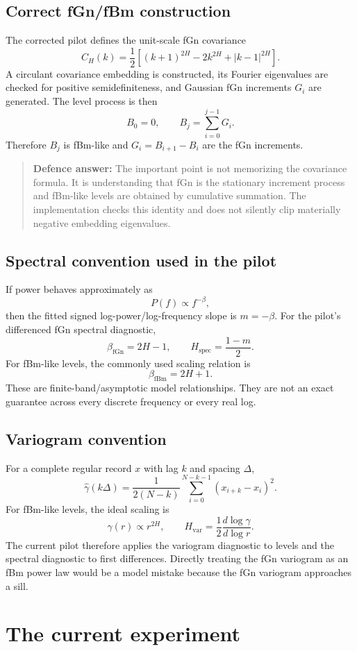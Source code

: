 \documentclass[11pt,a4paper]{article}
\newcommand{\answer}[1]{\begin{quote}\color{Navy}\textbf{Defence answer:} #1\end{quote}}
\begin{document}
\subsection{Correct fGn/fBm construction}
The corrected pilot defines the unit-scale fGn covariance
\[
C_H(k)=\frac{1}{2}\left[(k+1)^{2H}-2k^{2H}+|k-1|^{2H}\right].
\]
A circulant covariance embedding is constructed, its Fourier eigenvalues are checked for positive semidefiniteness, and Gaussian fGn increments $G_i$ are generated. The level process is then
\[
B_0=0,\qquad B_j=\sum_{i=0}^{j-1}G_i.
\]
Therefore $B_j$ is fBm-like and $G_i=B_{i+1}-B_i$ are the fGn increments.

\answer{The important point is not memorizing the covariance formula. It is understanding that fGn is the stationary increment process and fBm-like levels are obtained by cumulative summation. The implementation checks this identity and does not silently clip materially negative embedding eigenvalues.}

\subsection{Spectral convention used in the pilot}
If power behaves approximately as
\[
P(f)\propto f^{-\beta},
\]
then the fitted signed log-power/log-frequency slope is $m=-\beta$. For the pilot's differenced fGn spectral diagnostic,
\[
\beta_{\mathrm{fGn}}=2H-1,\qquad H_{\mathrm{spec}}=\frac{1-m}{2}.
\]
For fBm-like levels, the commonly used scaling relation is
\[
\beta_{\mathrm{fBm}}=2H+1.
\]
These are finite-band/asymptotic model relationships. They are not an exact guarantee across every discrete frequency or every real log.

\subsection{Variogram convention}
For a complete regular record $x$ with lag $k$ and spacing $\Delta$,
\[
\widehat{\gamma}(k\Delta)=\frac{1}{2(N-k)}\sum_{i=0}^{N-k-1}(x_{i+k}-x_i)^2.
\]
For fBm-like levels, the ideal scaling is
\[
\gamma(r)\propto r^{2H},\qquad H_{\mathrm{var}}=\frac{1}{2}\frac{d\log\gamma}{d\log r}.
\]
The current pilot therefore applies the variogram diagnostic to levels and the spectral diagnostic to first differences. Directly treating the fGn variogram as an fBm power law would be a model mistake because the fGn variogram approaches a sill.

\section{The current experiment}
\end{document}
